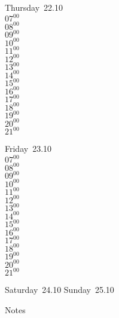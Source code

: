 \documentclass[11pt,a4paper]{book}\usepackage[]{graphicx}\usepackage[]{color}
\begin{document}
\clearpage
\begin{headerbox}
\end{headerbox}
\begin{weekdaybox}
  Thursday~22.10\\
  { 
  \vfill
  $07^{00}$\\
$08^{00}$\\
$09^{00}$\\
$10^{00}$\\
$11^{00}$\\
$12^{00}$\\
$13^{00}$\\
$14^{00}$\\
$15^{00}$\\
$16^{00}$\\
$17^{00}$\\
$18^{00}$\\
$19^{00}$\\
$20^{00}$\\
$21^{00}$\\
  }
\end{weekdaybox} 
\begin{weekdaybox}
  Friday~23.10\\
  { 
  \vfill
  $07^{00}$\\
$08^{00}$\\
$09^{00}$\\
$10^{00}$\\
$11^{00}$\\
$12^{00}$\\
$13^{00}$\\
$14^{00}$\\
$15^{00}$\\
$16^{00}$\\
$17^{00}$\\
$18^{00}$\\
$19^{00}$\\
$20^{00}$\\
$21^{00}$\\
  }
\end{weekdaybox}
\begin{weekendbox}
  Saturday~24.10
  \tcblower
  Sunday~25.10
\end{weekendbox} %
\begin{notebox}
  Notes
\end{notebox}
\clearpage
\end{document}

